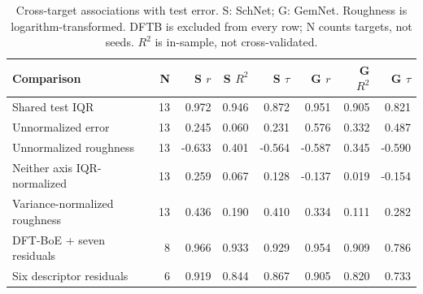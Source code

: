 \begin{table}[H]
\centering
\scriptsize
\setlength{\tabcolsep}{4pt}
\renewcommand{\arraystretch}{1.35}
\caption{Cross-target associations with test error. S: SchNet; G: GemNet. Roughness is logarithm-transformed. DFTB is excluded from every row; N counts targets, not seeds. $R^2$ is in-sample, not cross-validated.}
\begin{tabular}{lrrrrrrr}
\toprule
Comparison & N & S $r$ & S $R^2$ & S $\tau$ & G $r$ & G $R^2$ & G $\tau$ \\
\midrule
Shared test IQR & 13 & 0.972 & 0.946 & 0.872 & 0.951 & 0.905 & 0.821 \\
Unnormalized error & 13 & 0.245 & 0.060 & 0.231 & 0.576 & 0.332 & 0.487 \\
Unnormalized roughness & 13 & -0.633 & 0.401 & -0.564 & -0.587 & 0.345 & -0.590 \\
Neither axis IQR-normalized & 13 & 0.259 & 0.067 & 0.128 & -0.137 & 0.019 & -0.154 \\
Variance-normalized roughness & 13 & 0.436 & 0.190 & 0.410 & 0.334 & 0.111 & 0.282 \\
DFT-BoE + seven residuals & 8 & 0.966 & 0.933 & 0.929 & 0.954 & 0.909 & 0.786 \\
Six descriptor residuals & 6 & 0.919 & 0.844 & 0.867 & 0.905 & 0.820 & 0.733 \\
\bottomrule
\end{tabular}
\end{table}
